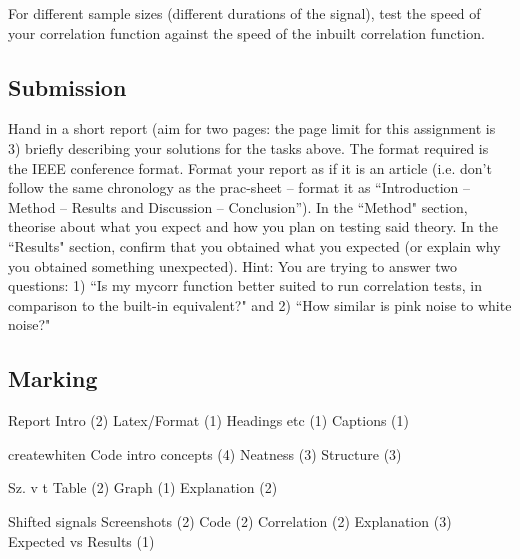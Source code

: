 For different sample sizes (different durations of the signal), test the speed of your correlation function against the speed of the inbuilt correlation function.

\subsection{Submission}
Hand in a short report (aim for two pages: the page limit for this assignment is 3) briefly describing your solutions for the tasks above. The format required is the IEEE conference format. Format your report as if it is an article (i.e. don’t follow the same chronology as the prac-sheet – format it as “Introduction – Method – Results and Discussion – Conclusion”). In the ``Method" section, theorise about what you expect and how you plan on testing said theory. In the ``Results" section, confirm that you obtained what you expected (or explain why you obtained something unexpected). Hint: You are trying to answer two questions: 1) ``Is my mycorr function better suited to run correlation tests, in comparison to the built-in equivalent?" and 2) ``How similar is pink noise to white noise?"

\subsection{Marking}
Report	
    Intro (2)
	Latex/Format (1)
	Headings etc (1)
	Captions (1)
	
createwhiten	
    Code intro concepts (4)
	Neatness (3)
	Structure (3)
	
Sz. v t	
    Table (2)
	Graph (1)
	Explanation (2)
	
Shifted signals	
    Screenshots (2)
	Code (2)
	Correlation (2)
	Explanation (3)
	Expected vs Results (1)
